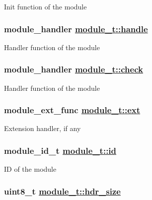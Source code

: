 Init function of the module \hypertarget{structmodule__t_2508e1e27ce2fbddbfb5aefcd5406bfb}{
\subsubsection[handle]{\setlength{\rightskip}{0pt plus 5cm}module\_\-handler \hyperlink{structmodule__t_2508e1e27ce2fbddbfb5aefcd5406bfb}{module\_\-t::handle}}}
\label{structmodule__t_2508e1e27ce2fbddbfb5aefcd5406bfb}


Handler function of the module \hypertarget{structmodule__t_ec8448cc809c87a4e86ed8534c3300af}{
\subsubsection[check]{\setlength{\rightskip}{0pt plus 5cm}module\_\-handler \hyperlink{structmodule__t_ec8448cc809c87a4e86ed8534c3300af}{module\_\-t::check}}}
\label{structmodule__t_ec8448cc809c87a4e86ed8534c3300af}


Handler function of the module \hypertarget{structmodule__t_04a569e519ee33f1391361047922fd2b}{
\subsubsection[ext]{\setlength{\rightskip}{0pt plus 5cm}module\_\-ext\_\-func \hyperlink{structmodule__t_04a569e519ee33f1391361047922fd2b}{module\_\-t::ext}}}
\label{structmodule__t_04a569e519ee33f1391361047922fd2b}


Extension handler, if any \hypertarget{structmodule__t_adfde6094c8c16eeeea923ddb5a958db}{
\subsubsection[id]{\setlength{\rightskip}{0pt plus 5cm}module\_\-id\_\-t \hyperlink{structmodule__t_adfde6094c8c16eeeea923ddb5a958db}{module\_\-t::id}}}
\label{structmodule__t_adfde6094c8c16eeeea923ddb5a958db}


ID of the module \hypertarget{structmodule__t_7641f6a11d4b3c82e2fc045b9c3cf0aa}{
\subsubsection[hdr\_\-size]{\setlength{\rightskip}{0pt plus 5cm}uint8\_\-t \hyperlink{structmodule__t_7641f6a11d4b3c82e2fc045b9c3cf0aa}{module\_\-t::hdr\_\-size}}}
\label{structmodule__t_7641f6a11d4b3c82e2fc045b9c3cf0aa}


